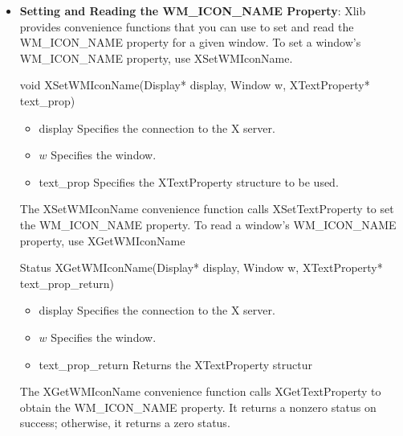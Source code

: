 \documentclass{report}
\begin{document}
\begin{itemize}
\begin{itemize}
            \bigbreak \noindent 
            WM\_NAME property has not been set for this window, XFetchName sets window\_name\_return to NULL. If the data returned by the server is in the Latin Portable Character Encoding, then the returned string is in the Host Portable Character Encoding. Otherwise, the result is implementation-dependent. When finished with it, a client must free the window name string using XFree.
            \bigbreak \noindent 
            XFetchName can generate a BadWindow error.
        \item \textbf{Setting and Reading the WM\_ICON\_NAME Property}: 
            Xlib provides convenience functions that you can use to set and read the WM\_ICON\_NAME property for a given window.
            \bigbreak \noindent 
            To set a window’s WM\_ICON\_NAME property, use XSetWMIconName. 
            \bigbreak \noindent 
            \begin{cppcode}
            void XSetWMIconName(Display* display, Window w, XTextProperty* text_prop)
            \end{cppcode}
            \bigbreak \noindent
            \begin{itemize}
                \item display Specifies the connection to the X server.
                \item $w$ Specifies the window.
                \item text\_prop Specifies the XTextProperty structure to be used.
            \end{itemize}
            The XSetWMIconName convenience function calls XSetTextProperty to set the WM\_ICON\_NAME property.
            \bigbreak \noindent 
            To read a window’s WM\_ICON\_NAME property, use XGetWMIconName
            \bigbreak \noindent 
            \begin{cppcode}
                Status XGetWMIconName(Display* display, Window w, XTextProperty* text_prop_return)
            \end{cppcode}
            \bigbreak \noindent
            \begin{itemize}
                \item display Specifies the connection to the X server.
                \item $w$ Specifies the window.
                \item text\_prop\_return Returns the XTextProperty structur
            \end{itemize}
            The XGetWMIconName convenience function calls XGetTextProperty to obtain the WM\_ICON\_NAME property. It returns a nonzero status on success; otherwise, it returns a zero status.

\end{itemize}
\end{itemize}
\end{document}
